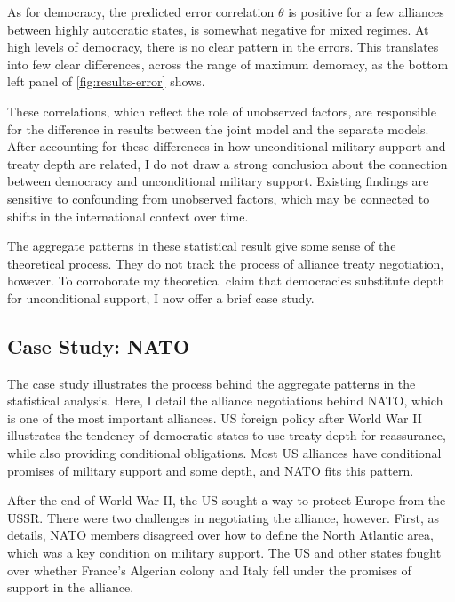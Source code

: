 \documentclass[12pt]{article}
\begin{document}
As for democracy, the predicted error correlation $\theta$ is positive for a few alliances between highly autocratic states, is somewhat negative for mixed regimes.
At high levels of democracy, there is no clear pattern in the errors. 
This translates into few clear differences, across the range of maximum demoracy, as the bottom left panel of \autoref{fig:results-error} shows. 


These correlations, which reflect the role of unobserved factors, are responsible for the difference in results between the joint model and the separate models. 
After accounting for these differences in how unconditional military support and treaty depth are related, I do not draw a strong conclusion about the connection between democracy and unconditional military support. 
Existing findings are sensitive to confounding from unobserved factors, which may be connected to shifts in the international context over time. 
 

The aggregate patterns in these statistical result give some sense of the theoretical process. 
They do not track the process of alliance treaty negotiation, however. 
To corroborate my theoretical claim that democracies substitute depth for unconditional support, I now offer a brief case study. 


\subsection{Case Study: NATO}


The case study illustrates the process behind the aggregate patterns in the statistical analysis. 
Here, I detail the alliance negotiations behind NATO, which is one of the most important alliances.
US foreign policy after World War II illustrates the tendency of democratic states to use treaty depth for reassurance, while also providing conditional obligations.  
Most US alliances have conditional promises of military support and some depth, and NATO fits this pattern. 


After the end of World War II, the US sought a way to protect Europe from the USSR. 
There were two challenges in negotiating the alliance, however.
First, as \citet{Poast2019a} details, NATO members disagreed over how to define the North Atlantic area, which was a key condition on military support. 
The US and other states fought over whether France's Algerian colony and Italy fell under the promises of support in the alliance. 
\end{document}
